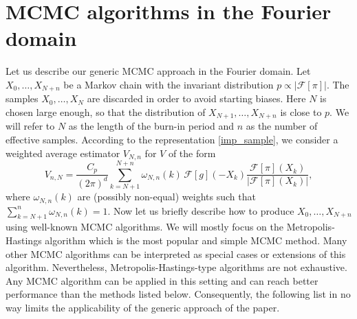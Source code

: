 \documentclass[preprint, 3p, authoryear]{elsarticle}
\theoremstyle{definition}
\begin{document}
\section{MCMC algorithms in the Fourier domain}\label{sec:alg}
Let us describe our generic MCMC approach in the Fourier domain. 
Let $X_0,\ldots,X_{N+n}$ be a Markov chain with the invariant distribution \(p\propto |\mathcal{F}[\pi]|\).
The samples $X_0,\ldots,X_{N}$ are discarded in order to avoid starting biases. 
Here $N$ is  chosen large enough, so that the distribution of $X_{N+1},\ldots,X_{N+n}$
is close to $p$.
We will refer to $N$ as the length of the burn-in period and $n$ as
the number of effective samples. 
According to the representation \eqref{imp_sample}, we consider a weighted average estimator 
$V_{N,n}$ for \(V\) of the form
\begin{equation}\label{eq:29032018a2}
V_{n,N}=\frac{C_{p}}{(2\pi)^d}\sum_{k=N+1}^{N+n}\omega_{N,n}(k)\,\mathcal{F}[g](-X_k)\frac{\mathcal{F}[\pi](X_k)}{|\mathcal{F}[\pi](X_k)|},
\end{equation}
where $\omega_{N,n}(k)$ are (possibly non-equal) weights such that $\sum_{k=N+1}^n  \omega_{N,n}(k) =1$.
Now let us briefly describe how to produce $X_0,\ldots,X_{N+n}$ using well-known MCMC algorithms.
We will mostly focus on the Metropolis-Hastings algorithm which 
is the most popular and simple MCMC method. Many other MCMC 
algorithms can be interpreted as special cases or extensions of this algorithm.
Nevertheless, Metropolis-Hastings-type algorithms are not exhaustive. Any MCMC algorithm can be applied in this setting
and can reach better performance than the methods listed below. Consequently, the following list in no way
limits the applicability of the generic approach of the paper.
\end{document}
